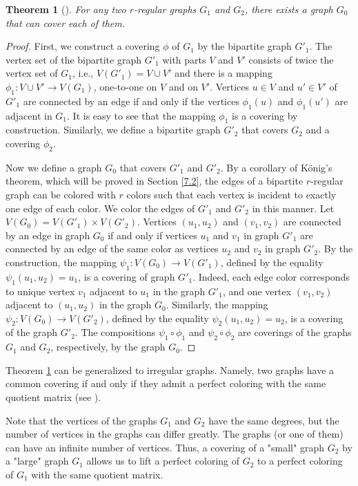 \documentclass[11pt]{article}
\newtheorem{theorem}{Theorem}[section]
\theoremstyle{definition}
\begin{document}
\begin{theorem}[\cite{Angluin}]\label{Angl}
For any two $r$-regular graphs $G_1$ and $G_2$, there exists a graph
$G_0$ that can cover each of them.
\end{theorem}
\begin{proof}
First, we construct a covering $\phi$ of $G_1$ by the bipartite graph
$G'_1$. The vertex set of the bipartite graph $G'_1$ with parts $V$ and $V'$ consists of
twice the vertex set of $G_1$, i.e., $V(G'_1) =V \cup V'$
and there is a mapping $\phi_1:V \cup V'\rightarrow V(G_1)$,
one-to-one on $V$ and on $V'$.
Vertices $u\in V$ and $u'\in V'$ of $G'_1$ are connected by an edge
if and only
if the vertices $\phi_1(u)$ and $\phi_1(u')$ are adjacent in $G_1$.
It is easy to see that the mapping $\phi_1$ is a covering by
construction. Similarly, we define a bipartite graph $G'_2$ that
covers $G_2$ and a covering $\phi_2$.

Now we define a graph $G_0$ that covers $G'_1$ and
$G'_2$. By a corollary of König's theorem, which will be proved in Section \ref{7.2}, the edges of a bipartite $r$-regular
graph can be colored with $r$ colors such that each vertex is incident to exactly one edge of each  color. We color
the edges of $G'_1$ and $G'_2$ in this manner. Let
$V(G_0)=V(G'_1)\times V(G'_2)$. Vertices $(u_1,u_2)$ and $(v_1,v_2)$
are connected by an edge in graph $G_0$ if and only if vertices
$u_1$ and $v_1$ in graph $G'_1$ are connected by an edge of the same color
as vertices $u_2$ and $v_2$ in graph $G'_2$. By the construction,
the mapping $\psi_1:V(G_0)\rightarrow V(G'_1)$, defined
by the equality $\psi_1(u_1,u_2)=u_1$, is a covering of graph $G'_1$. Indeed, each edge color corresponds to unique vertex
$v_1$ adjacent to $u_1$ in the graph $G'_1$, and one vertex
$(v_1,v_2)$ adjacent to $(u_1,u_2)$ in the graph $G_0$. Similarly,
the mapping $\psi_2:V(G_0)\rightarrow V(G'_2)$, defined
by the equality $\psi_2(u_1,u_2)=u_2$, is a covering of the graph $G'_2$.
The compositions $\psi_1\circ \phi_1$ and $\psi_2\circ \phi_2$ are
coverings of the graphs $G_1$ and $G_2$, respectively, by the graph $G_0$.
\end{proof}

Theorem \ref{Angl} can be generalized to irregular graphs. Namely, two graphs have a common covering if and only if they admit a perfect coloring with the same quotient matrix
(see \cite{Lei}).


Note that the vertices of the graphs $G_1$ and $G_2$ have the same degrees,
but the number of vertices in the graphs can differ greatly. The graphs (or one
of them) can have an infinite number of vertices. Thus,
a covering of a "small" graph  $G_2$ by a "large" graph $G_1$ allows us to lift a perfect
coloring of   $G_2$  to a perfect coloring of $G_1$ with the same quotient matrix. 
\end{document}
